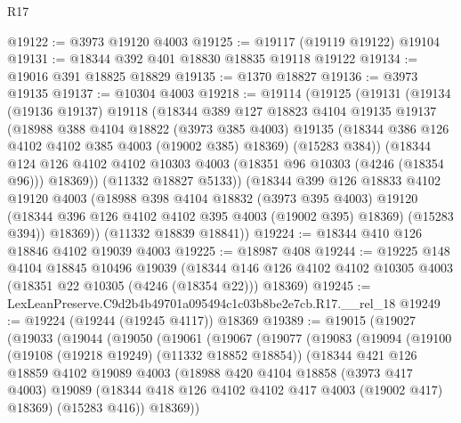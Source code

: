 \begin{lexlean}{R17}
\begin{coremodule}
@19122 := @3973 @19120 @4003
@19125 := @19117 (@19119 @19122) @19104
@19131 := @18344 @392 @401 @18830 @18835 @19118 @19122
@19134 := @19016 @391 @18825 @18829
@19135 := @1370 @18827
@19136 := @3973 @19135
@19137 := @10304 @4003
@19218 := @19114
    (@19125
      (@19131
        (@19134
          (@19136 @19137)
          @19118
          (@18344
            @389
            @127
            @18823
            @4104
            @19135
            @19137
            (@18988
              @388
              @4104
              @18822
              (@3973 @385 @4003)
              @19135
              (@18344 @386 @126 @4102 @4102 @385 @4003 (@19002 @385) @18369)
              (@15283 @384))
            (@18344
              @124
              @126
              @4102
              @4102
              @10303
              @4003
              (@18351 @96 @10303 (@4246 (@18354 @96)))
              @18369))
          (@11332 @18827 @5133))
        (@18344
          @399
          @126
          @18833
          @4102
          @19120
          @4003
          (@18988
            @398
            @4104
            @18832
            (@3973 @395 @4003)
            @19120
            (@18344 @396 @126 @4102 @4102 @395 @4003 (@19002 @395) @18369)
            (@15283 @394))
          @18369))
      (@11332 @18839 @18841))
@19224 := @18344 @410 @126 @18846 @4102 @19039 @4003
@19225 := @18987 @408
@19244 := @19225
    @148
    @4104
    @18845
    @10496
    @19039
    (@18344 @146 @126 @4102 @4102 @10305 @4003 (@18351 @22 @10305 (@4246 (@18354 @22))) @18369)
@19245 := LexLeanPreserve.C9d2b4b49701a095494c1c03b8be2e7cb.R17.__rel_18
@19249 := @19224 (@19244 (@19245 @4117)) @18369
@19389 := @19015
    (@19027
      (@19033
        (@19044
          (@19050
            (@19061
              (@19067
                (@19077
                  (@19083
                    (@19094
                      (@19100
                        (@19108 (@19218 @19249) (@11332 @18852 @18854))
                        (@18344
                          @421
                          @126
                          @18859
                          @4102
                          @19089
                          @4003
                          (@18988
                            @420
                            @4104
                            @18858
                            (@3973 @417 @4003)
                            @19089
                            (@18344 @418 @126 @4102 @4102 @417 @4003 (@19002 @417) @18369)
                            (@15283 @416))
                          @18369))

\end{coremodule}
\end{lexlean}
